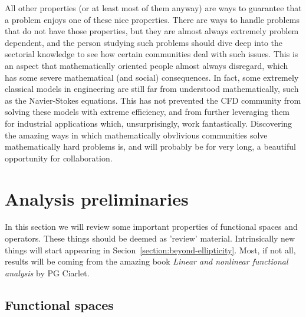 \documentclass{article}
\begin{document}
All other properties (or at least most of them anyway) are ways to guarantee that a problem enjoys one of these nice properties. There are ways to handle problems that do not have those properties, but they are almost always extremely problem dependent, and the person studying such problems should dive deep into the sectorial knowledge to see how certain communities deal with such issues. This is an aspect that mathematically oriented people almost always disregard, which has some severe mathematical (and social) consequences. In fact, some extremely classical models in engineering are still far from understood mathematically, such as the Navier-Stokes equations. This has not prevented the CFD community from solving these models with extreme efficiency, and from further leveraging them for industrial applications which, unsurprisingly, work fantastically. Discovering the amazing ways in which mathematically obvlivious communities solve mathematically hard problems is, and will probably be for very long, a beautiful opportunity for collaboration.

\section{Analysis preliminaries}
In this section we will review some important properties of functional spaces and operators. These things should be deemed as 'review' material. Intrinsically new things will start appearing in Secion~\ref{section:beyond-ellipticity}. Most, if not all, results will be coming from the amazing book \emph{Linear and nonlinear functional analysis} by PG Ciarlet.

\subsection{Functional spaces}
\end{document}
